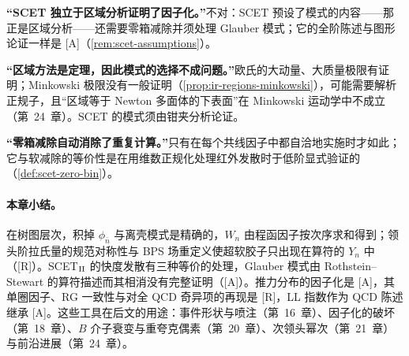 \begin{tcolorbox}[enhanced,breakable,title=常见误解,fonttitle=\bfseries,
  colback=gray!3!white,colframe=gray!55!black,boxrule=0.6pt,arc=2pt,
  left=5pt,right=5pt,top=3pt,bottom=3pt,before skip=6pt,after skip=6pt]
\textbf{“SCET 独立于区域分析证明了因子化。”}不对：SCET 预设了模式的内容——那正是区域分析——还需要零箱减除并须处理 Glauber 模式；它的全阶陈述与图形论证一样是 [A]（\cref{rem:scet-assumptions}）。\par
\textbf{“区域方法是定理，因此模式的选择不成问题。”}欧氏的大动量、大质量极限有证明\cite{Smirnov:1990rz}；Minkowski 极限没有一般证明（\cref{prop:ir-regions-minkowski}），可能需要解析正规子，且“区域等于 Newton 多面体的下表面”在 Minkowski 运动学中不成立\cite{Gardi:2024axt}（第~24~章）。SCET 的模式须由钳夹分析论证。\par
\textbf{“零箱减除自动消除了重复计算。”}只有在每个共线因子中都自洽地实施时才如此；它与软减除的等价性是在用维数正规化处理红外发散时于低阶显式验证的（\cref{def:scet-zero-bin}）。
\end{tcolorbox}

\paragraph{本章小结。}
在树图层次，积掉 $\phi_{\bar n}$ 与离壳模式是精确的，$W_n$ 由程函因子按次序求和得到；领头阶拉氏量的规范对称性与 BPS 场重定义使超软胶子只出现在算符的 $Y_n$ 中（[R]）。SCET$_{\rm II}$ 的快度发散有三种等价的处理，Glauber 模式由 Rothstein--Stewart 的算符描述而其相消没有完整证明（[A]）。推力分布的因子化是 [A]，其单圈因子、RG 一致性与对全 QCD 奇异项的再现是 [R]，LL 指数作为 QCD 陈述继承 [A]。这些工具在后文的用途：事件形状与喷注（第~16~章）、因子化的破坏（第~18~章）、$B$ 介子衰变与重夸克偶素（第~20~章）、次领头幂次（第~21~章）与前沿进展（第~24~章）。

